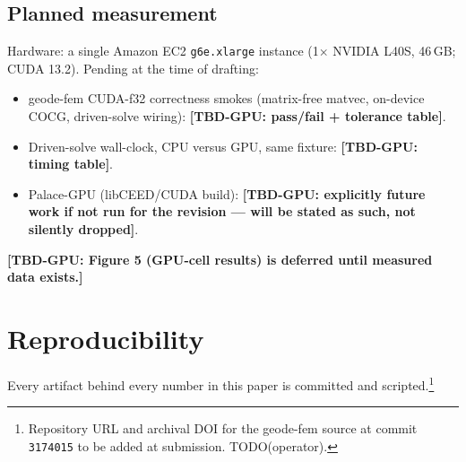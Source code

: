 \documentclass{anvil-paper}
\newcommand{\TBDGPU}[1]{\textcolor{red!75!black}{\textbf{[TBD-GPU: #1]}}}
\begin{document}
\subsection{Planned measurement}

Hardware: a single Amazon EC2 \texttt{g6e.xlarge} instance (1$\times$
NVIDIA L40S, 46\,GB; CUDA 13.2). Pending at the time of drafting:
\begin{itemize}
  \item geode-fem CUDA-f32 correctness smokes (matrix-free matvec,
    on-device COCG, driven-solve wiring): \TBDGPU{pass/fail + tolerance
    table}.
  \item Driven-solve wall-clock, CPU versus GPU, same fixture:
    \TBDGPU{timing table}.
  \item Palace-GPU (libCEED/CUDA build): \TBDGPU{explicitly future work if
    not run for the revision --- will be stated as such, not silently
    dropped}.
\end{itemize}

\TBDGPU{Figure 5 (GPU-cell results) is deferred until measured data
exists.}

\section{Reproducibility}
\label{sec:repro}

Every artifact behind every number in this paper is committed and
scripted.\footnote{Repository URL and archival DOI for the geode-fem
source at commit \texttt{3174015} to be added at submission.
TODO(operator).}
\end{document}
